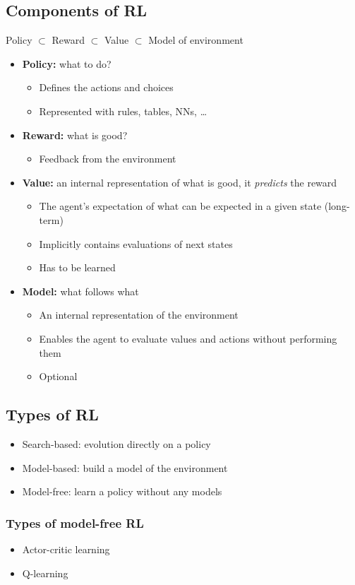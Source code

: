 \documentclass{article}
\begin{document}
    \subsection{Components of RL}
    Policy $\subset$ Reward $\subset$ Value $\subset$ Model of environment
    \begin{itemize}
        \item \textbf{Policy:} what to do?
        \begin{itemize}
            \item Defines the actions and choices
            \item Represented with rules, tables, NNs, \ldots
        \end{itemize}
        \item \textbf{Reward:} what is good?
        \begin{itemize}
            \item Feedback from the environment
        \end{itemize}
        \item \textbf{Value:} an internal representation of what is good, it \textit{predicts} the reward
        \begin{itemize}
            \item The agent's expectation of what can be expected in a given state (long-term)
            \item Implicitly contains evaluations of next states
            \item Has to be learned
        \end{itemize}
        \item \textbf{Model:} what follows what
        \begin{itemize}
            \item An internal representation of the environment
            \item Enables the agent to evaluate values and actions without performing them
            \item Optional
        \end{itemize}
    \end{itemize}

    \subsection{Types of RL}
    \begin{itemize}
        \item Search-based: evolution directly on a policy
        \item Model-based: build a model of the environment
        \item Model-free: learn a policy without any models
    \end{itemize}

        \subsubsection{Types of model-free RL}
        \begin{itemize}
            \item Actor-critic learning
            \item Q-learning
        \end{itemize}
    \newpage
\end{document}
